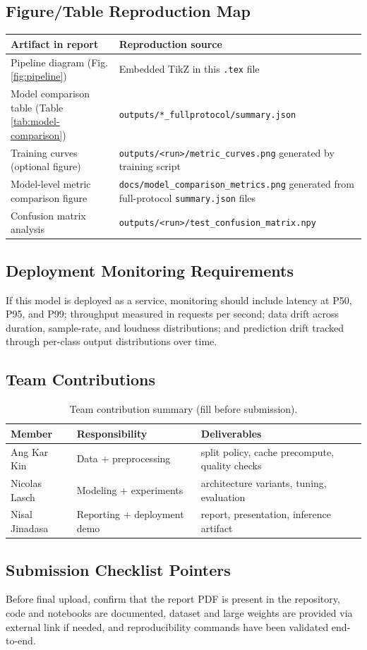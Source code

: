 \documentclass[11pt,a4paper]{article}
\begin{document}
\subsection{Figure/Table Reproduction Map}
\begin{longtable}{>{\raggedright\arraybackslash}p{} >{\raggedright\arraybackslash}p{}}
\toprule
Artifact in report & Reproduction source \\
\midrule
Pipeline diagram (Fig. \ref{fig:pipeline}) & Embedded TikZ in this \texttt{.tex} file \\
Model comparison table (Table \ref{tab:model-comparison}) & \texttt{outputs/*\_fullprotocol/summary.json} \\
Training curves (optional figure) & \texttt{outputs/<run>/metric\_curves.png} generated by training script \\
Model-level metric comparison figure & \texttt{docs/model\_comparison\_metrics.png} generated from full-protocol \texttt{summary.json} files \\
Confusion matrix analysis & \texttt{outputs/<run>/test\_confusion\_matrix.npy} \\
\bottomrule
\end{longtable}

\subsection{Deployment Monitoring Requirements}
If this model is deployed as a service, monitoring should include latency at P50, P95, and P99; throughput measured in requests per second; data drift across duration, sample-rate, and loudness distributions; and prediction drift tracked through per-class output distributions over time.

\subsection{Team Contributions}
\begin{table}[H]
\centering
\caption{Team contribution summary (fill before submission).}
\begin{tabular}{lll}
\toprule
Member & Responsibility & Deliverables \\
\midrule
Ang Kar Kin & Data + preprocessing & split policy, cache precompute, quality checks \\
Nicolas Lasch & Modeling + experiments & architecture variants, tuning, evaluation \\
Nisal Jinadasa & Reporting + deployment demo & report, presentation, inference artifact \\
\bottomrule
\end{tabular}
\end{table}

\subsection{Submission Checklist Pointers}
Before final upload, confirm that the report PDF is present in the repository, code and notebooks are documented, dataset and large weights are provided via external link if needed, and reproducibility commands have been validated end-to-end.
\end{document}
